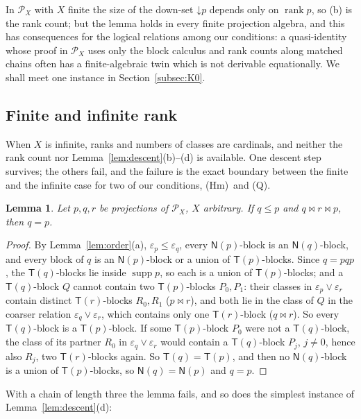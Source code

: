 \documentclass[11pt]{amsart}
\newtheorem{lemma}[theorem]{Lemma}
\theoremstyle{definition}
\renewcommand{\P}{\mathcal{P}}      %
\newcommand{\supp}{\operatorname{supp}}
\newcommand{\T}{\mathsf{T}}
\newcommand{\N}{\mathsf{N}}
\newcommand{\rk}{\operatorname{rank}}
\newcommand{\mt}{\bowtie}      %
\newcommand{\dn}{\mathord\downarrow}
\newcommand{\Qcond}{\textup{(Q)}}
\newcommand{\Kzero}{\textup{(Hm)}}     %
\begin{document}
In $\P_X$ with $X$ finite the size of the down-set $\dn p$ depends only on $\rk p$, so (b) is the rank count; but the lemma holds in every finite projection algebra, and this has consequences for the logical relations among our conditions: a quasi-identity whose proof in $\P_X$ uses only the block calculus and rank counts along matched chains often has a finite-algebraic twin which is not derivable equationally. We shall meet one instance in Section~\ref{subsec:K0}.

\subsection{Finite and infinite rank}\label{subsec:rank}

When $X$ is infinite, ranks and numbers of classes are cardinals, and neither the rank count nor Lemma~\ref{lem:descent}(b)--(d) is available. One descent step survives; the others fail, and the failure is the exact boundary between the finite and the infinite case for two of our conditions, \Kzero\ and \Qcond.

\begin{lemma}\label{lem:psi}
Let $p,q,r$ be projections of $\P_X$, $X$ arbitrary. If $q\le p$ and $q\mt r\mt p$, then $q=p$.
\end{lemma}

\begin{proof}
By Lemma~\ref{lem:order}(a), $\varepsilon_p\le\varepsilon_q$, every $\N(p)$-block is an $\N(q)$-block, and every block of $q$ is an $\N(p)$-block or a union of $\T(p)$-blocks. Since $q=pqp$, the $\T(q)$-blocks lie inside $\supp p$, so each is a union of $\T(p)$-blocks; and a $\T(q)$-block $Q$ cannot contain two $\T(p)$-blocks $P_0,P_1$: their classes in $\varepsilon_p\vee\varepsilon_r$ contain distinct $\T(r)$-blocks $R_0,R_1$ ($p\mt r$), and both lie in the class of $Q$ in the coarser relation $\varepsilon_q\vee\varepsilon_r$, which contains only one $\T(r)$-block ($q\mt r$). So every $\T(q)$-block is a $\T(p)$-block. If some $\T(p)$-block $P_0$ were not a $\T(q)$-block, the class of its partner $R_0$ in $\varepsilon_q\vee\varepsilon_r$ would contain a $\T(q)$-block $P_j$, $j\ne0$, hence also $R_j$, two $\T(r)$-blocks again. So $\T(q)=\T(p)$, and then no $\N(q)$-block is a union of $\T(p)$-blocks, so $\N(q)=\N(p)$ and $q=p$.
\end{proof}

With a chain of length three the lemma fails, and so does the simplest instance of Lemma~\ref{lem:descent}(d):
\end{document}
